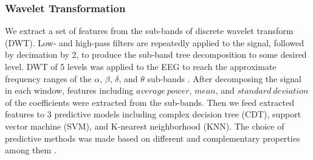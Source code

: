 \documentclass{article}
\begin{document}
\subsubsection{Wavelet Transformation}
\vspace{-5pt}
 We extract a set of features from the sub-bands of discrete wavelet transform (DWT). Low- and high-pass filters are repeatedly applied to the signal, followed by decimation by 2, to produce the sub-band tree decomposition to some desired level. DWT of 5 levels was applied to the EEG to reach the approximate frequency ranges of the $\alpha$, $\beta$, $\delta$, and $\theta$ sub-bands \cite{Subasi}.
After decomposing the signal in each window, features including $average \ power$, 
 $mean$, and  
$standard \ deviation$ of the coefficients were extracted from the sub-bands. Then we feed extracted features to 3 predictive models including complex decision tree (CDT), support vector machine (SVM), and K-nearest neighborhood (KNN). 
The choice of predictive methods was made based on different and complementary properties among them \cite{kuncheva}.
\vspace{-9pt}
\end{document}
